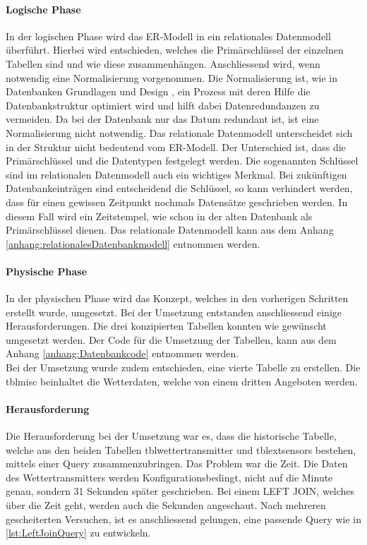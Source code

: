 \paragraph{Logische Phase}

In der logischen Phase wird das ER-Modell in ein relationales Datenmodell überführt.
Hierbei wird entschieden, welches die Primärschlüssel der einzelnen Tabellen sind und wie diese zusammenhängen. Anschliessend wird, wenn notwendig eine Normalisierung vorgenommen. Die Normalisierung ist, wie in Datenbanken Grundlagen und Design \cite{FrankGeisler2011mitpu}, ein Prozess mit deren Hilfe die Datenbankstruktur optimiert wird und hilft dabei Datenredundanzen zu vermeiden. Da bei der Datenbank nur das Datum redundant ist, ist eine Normalisierung nicht notwendig. Das relationale Datenmodell unterscheidet sich in der Struktur nicht bedeutend vom ER-Modell. Der Unterschied  ist, dass die Primärschlüssel und die Datentypen festgelegt werden. Die sogenannten Schlüssel sind im relationalen Datenmodell auch ein wichtiges Merkmal. Bei zukünftigen Datenbankeinträgen sind entscheidend die Schlüssel, so kann verhindert werden, dass für einen gewissen Zeitpunkt nochmals Datensätze geschrieben werden. In diesem Fall wird ein Zeitstempel, wie schon in der alten Datenbank als Primärschlüssel dienen. Das relationale Datenmodell kann aus dem Anhang \ref{anhang:relationalesDatenbankmodell} entnommen werden.

\paragraph{Physische Phase}

In der physischen Phase wird das Konzept, welches in den vorherigen Schritten erstellt wurde, umgesetzt. Bei der Umsetzung entstanden anschliessend einige Herausforderungen. Die drei konzipierten Tabellen konnten wie gewünscht umgesetzt werden. Der Code für die Umsetzung der Tabellen, kann aus dem Anhang \ref{anhang:Datenbankcode} entnommen werden.\\
Bei der Umsetzung wurde zudem entschieden, eine vierte Tabelle zu erstellen. Die tblmisc beinhaltet die Wetterdaten, welche von einem dritten Angeboten werden.

\paragraph{Herausforderung}
Die Herausforderung bei der Umsetzung war es, dass die historische Tabelle, welche aus den beiden Tabellen tblwettertransmitter und tblextsensors bestehen, mittels einer Query zusammenzubringen. Das Problem war die Zeit. Die Daten des Wettertransmitters werden Konfigurationsbedingt, nicht auf die Minute genau, sondern 31 Sekunden später geschrieben. Bei einem LEFT JOIN, welches über die Zeit geht, werden auch die Sekunden angeschaut. Nach mehreren gescheiterten Versuchen, ist es anschliessend gelungen, eine passende Query wie in \ref{lst:LeftJoinQuery} zu entwickeln. 

